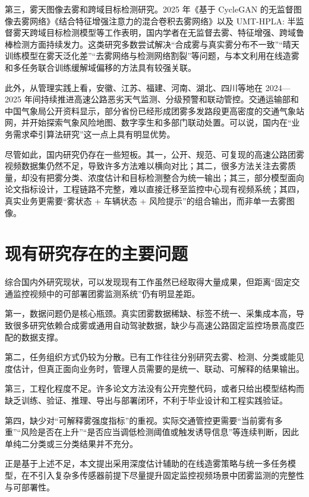 第三，雾天图像去雾和跨域目标检测研究。2025 年《基于 CycleGAN 的无监督图像去雾网络》《结合特征增强注意力的混合卷积去雾网络》以及 UMT-HPLA: 半监督雾天跨域目标检测模型等工作表明，国内学者在无监督去雾、特征增强、跨域鲁棒检测方面持续发力。这类研究多数尝试解决“合成雾与真实雾分布不一致”“晴天训练模型在雾天泛化差”“去雾网络与检测网络割裂”等问题，与本文利用在线造雾和多任务联合训练缓解域偏移的方法具有较强关联。

此外，从管理实践上看，安徽、江苏、福建、河南、湖北、四川等地在 2024—2025 年间持续推进高速公路恶劣天气监测、分级预警和联动管控。交通运输部和中国气象局公开资料显示，部分省份已经形成团雾多发路段更高密度的交通气象站网，并开始探索气象风险地图、数字孪生和多部门联动处置。可以说，国内在“业务需求牵引算法研究”这一点上具有明显优势。

尽管如此，国内研究仍存在一些短板。其一，公开、规范、可复现的高速公路团雾视频数据集仍然不足，导致许多方法难以横向对比；其二，很多方法关注去雾质量，却没有把雾分类、浓度估计和目标检测整合为统一输出；其三，部分模型面向论文指标设计，工程链路不完整，难以直接迁移至监控中心现有视频系统；其四，真实业务更需要“雾状态 + 车辆状态 + 风险提示”的组合输出，而非单一去雾图像。

\section{现有研究存在的主要问题}

综合国内外研究现状，可以发现现有工作虽然已经取得大量成果，但距离“固定交通监控视频中的可部署团雾监测系统”仍有明显差距。

第一，数据问题仍是核心瓶颈。真实团雾数据稀缺、标签不统一、采集成本高，导致很多研究依赖合成雾或通用自动驾驶数据，缺少与高速公路固定监控场景高度匹配的数据支撑。

第二，任务组织方式仍较为分散。已有工作往往分别研究去雾、检测、分类或能见度估计，但真正面向业务时，管理人员需要的是统一、联动、可解释的结果输出。

第三，工程化程度不足。许多论文方法没有公开完整代码，或者只给出模型结构而缺乏训练、验证、推理、导出与部署闭环，不利于毕业设计和工程实践验证。

第四，缺少对“可解释雾强度指标”的重视。实际交通管控更需要“当前雾有多重”“风险是否在上升”“是否应当调低检测阈值或触发诱导信息”等连续判断，因此单纯二分类或三分类结果并不充分。

正是基于上述不足，本文提出采用深度估计辅助的在线造雾策略与统一多任务模型，在不引入复杂多传感器前提下尽量提升固定监控视频场景中团雾监测的完整性与可部署性。
